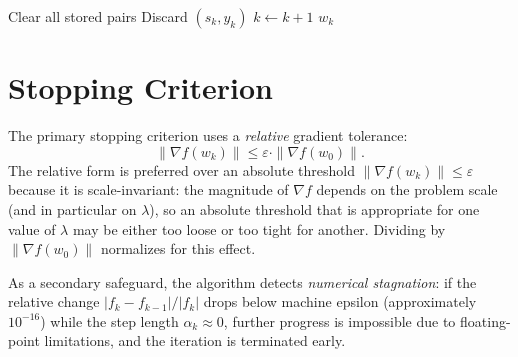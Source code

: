 \begin{algorithm}[H]
\begin{algorithmic}[1]
    
            \State Clear all stored pairs
        \Else
            \State Discard $(s_k, y_k)$
        \EndIf
        \State $k \gets k + 1$
    \EndWhile
    \State \Return $w_k$
\end{algorithmic}
\end{algorithm}


\section{Stopping Criterion}
\label{sec:stopping}

\noindent The primary stopping criterion uses a \emph{relative} gradient tolerance:
\begin{equation}
\label{eq:stop_rel}
    \|\nabla f(w_k)\| \leq \varepsilon \cdot \|\nabla f(w_0)\|.
\end{equation}
The relative form is preferred over an absolute threshold $\|\nabla f(w_k)\| \leq
\varepsilon$ because it is scale-invariant: the magnitude of $\nabla f$ depends
on the problem scale (and in particular on $\lambda$), so an absolute threshold
that is appropriate for one value of $\lambda$ may be either too loose or too
tight for another. Dividing by $\|\nabla f(w_0)\|$ normalizes for this effect.

\noindent As a secondary safeguard, the algorithm detects \emph{numerical
stagnation}: if the relative change $|f_k - f_{k-1}|/|f_k|$ drops below machine
epsilon (approximately $10^{-16}$) while the step length $\alpha_k \approx 0$,
further progress is impossible due to floating-point limitations, and the
iteration is terminated early.




